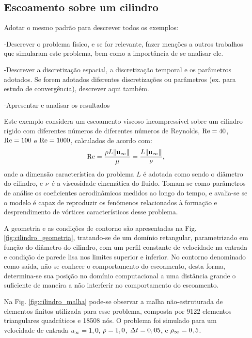 \documentclass[tese_patricia]{subfiles}%
\begin{document}
\subsection{Escoamento sobre um cilindro} \label{capitulo:Cap2:VerApl:Cilindo}

{Adotar o mesmo padrão para descrever todos os exemplos:

-Descrever o problema físico, e se for relevante, fazer menções a outros trabalhos que simularam este problema, bem como a importância de se analisar ele.

-Descrever a discretização espacial, a discretização temporal e os parâmetros adotados. Se forem adotados diferentes discretizações ou parâmetros (ex. para estudo de convergência), descrever aqui também.

-Apresentar e analisar os resultados
}

Este exemplo considera um escoamento viscoso incompressível sobre um cilindro rígido com diferentes números de diferentes números de Reynolds, $\mathrm{Re} = 40$, $\mathrm{Re} = 100$ e $\mathrm{Re} = 1000$, calculados de acordo com:
\begin{align}
	\mathrm{Re} = \frac{\rho L \lVert\mathbf{u}_{\infty}\lVert}{\mu} = \frac{L \lVert \mathbf{u}_{\infty} \lVert}{\nu}, \label{eq:Reynolds}
\end{align}
\noindent onde a dimensão característica do problema $L$ é adotada como sendo o diâmetro do cilindro, e $\nu$ é a viscosidade cinemática do fluido. Tomam-se como parâmetros de análise os coeficientes aerodinâmicos medidos ao longo do tempo, e avalia-se se o modelo é capaz de reproduzir os fenômenos relacionados à formação e desprendimento de vórtices característicos desse problema. 

A geometria e as condições de contorno são apresentadas na Fig. \ref{fig:cilindro_geometria}, tratando-se de um domínio retangular, parametrizado em função do diâmetro do cilindro, com um perfil constante de velocidade na entrada e condição de parede lisa nos limites superior e inferior. No contorno denominado como saída, não se conhece o comportamento do escoamento, desta forma, determina-se sua posição no domínio computacional a uma distância grande o suficiente de maneira a não interferir no comportamento do escoamento. 

Na Fig. \ref{fig:cilindro_malha} pode-se observar a malha não-estruturada de elementos finitos utilizada para esse problema, composta por 9122 elementos triangulares quadráticos e 18508 nós. O problema foi simulado para um velocidade de entrada $u_{\infty} = 1,0$, $\rho = 1,0$, $\Delta t = 0,05$, e $\rho_\infty = 0,5$. 
\end{document}
